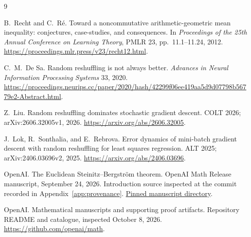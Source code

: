 \documentclass[11pt,letterpaper]{article}
\numberwithin{equation}{section}
\theoremstyle{definition}
\begin{document}
\begin{thebibliography}{9}\raggedright
{}
B.~Recht and C.~R\'e.
\newblock Toward a noncommutative arithmetic-geometric mean inequality: conjectures, case-studies, and consequences.
\newblock In \emph{Proceedings of the 25th Annual Conference on Learning Theory}, PMLR 23, pp.~11.1--11.24, 2012.
\newblock \url{https://proceedings.mlr.press/v23/recht12.html}.

C.~M.~De Sa.
\newblock Random reshuffling is not always better.
\newblock \emph{Advances in Neural Information Processing Systems} 33, 2020.
\newblock \url{https://proceedings.neurips.cc/paper/2020/hash/42299f06ee419aa5d9d07798b56779e2-Abstract.html}.

Z.~Liu.
\newblock Random reshuffling dominates stochastic gradient descent.
\newblock COLT 2026; arXiv:2606.32005v1, 2026.
\newblock \url{https://arxiv.org/abs/2606.32005}.

J.~Lok, R.~Sonthalia, and E.~Rebrova.
\newblock Error dynamics of mini-batch gradient descent with random reshuffling for least squares regression.
\newblock ALT 2025; arXiv:2406.03696v2, 2025.
\newblock \url{https://arxiv.org/abs/2406.03696}.

OpenAI.
\newblock The Euclidean Steinitz--Bergstr\"om theorem.
\newblock OpenAI Math Release manuscript, September 24, 2026. Introduction source inspected at the commit recorded in Appendix~\ref{app:provenance}.
\newblock \href{https://github.com/openai/math/tree/fd4aeeb2ee4fc729c18d98444fed42fd0529eeeb/preprints/The-Euclidean-Steinitz-Bergstrom-theorem-September-24-2026}{Pinned manuscript directory}.

OpenAI.
\newblock Mathematical manuscripts and supporting proof artifacts.
\newblock Repository README and catalogue, inspected October 8, 2026.
\newblock \url{https://github.com/openai/math}.
\end{thebibliography}
\end{document}
